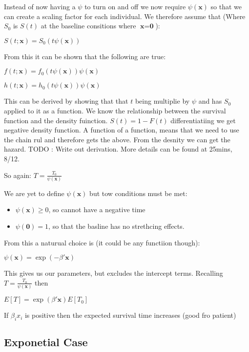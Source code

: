 \documentclass[
  letterpaper,
  DIV=11,
  numbers=noendperiod]{scrreprt}
\providecommand{\tightlist}{%
  \setlength{\itemsep}{0pt}\setlength{\parskip}{0pt}}\usepackage{longtable,booktabs,array}
\begin{document}
Instead of now having a \(\psi\) to turn on and off we now require
\(\psi(\textbf{x})\) so that we can create a scaling factor for each
individual. We therefore assume that (Where \(S_0\) is \(S(t)\) at the
baseline consitions where \(\textbf{x} = \textbf{0}\)):

\(S(t;\textbf{x}) = S_0(t\psi(\textbf{x}))\)

From this it can be shown that the following are true:

\(f(t;\textbf{x}) = f_0(t\psi(\textbf{x}))\psi(\textbf{x})\)

\(h(t;\textbf{x}) = h_0(t\psi(\textbf{x}))\psi(\textbf{x})\)

This can be derived by showing that that \(t\) being multiplie by
\(\psi\) and has \(S_0\) applied to it as a function. We know the
relationship between the survival function and the density fuinction.
\(S(t) = 1- F(t)\) differentiatiing we get negative density function. A
function of a function, means that we need to use the chain rul and
therefore gets the above. From the desnity we can get the hazard. TODO :
Write out derivation. More details can be found at 25mins, 8/12.

So again: \(T = \frac{T_0}{\psi(\textbf{x})}\)

We are yet to define \(\psi(\textbf{x})\) but tow conditions must be
met:

\begin{itemize}
\tightlist
\item
  \(\psi(\textbf{x})\geq 0\), so cannot have a negative time
\item
  \(\psi(\textbf{0}) = 1\), so that the basline has no strethcing
  effects.
\end{itemize}

From this a naturual choice is (it could be any functiion though):

\({\psi(\textbf{x})} = \exp(-\beta'\textbf{x})\)

This gives us our parameters, but excludes the intercept terms.
Recalling \(T = \frac{T_0}{\psi(\textbf{x})}\) then

\(E[T] = \exp(\beta'\textbf{x})E[T_0]\)

If \(\beta_i x_i\) is positive then the expected survival time increases
(good fro patient)

\hypertarget{exponetial-case}{%
\subsection{Exponetial Case}\label{exponetial-case}}
\end{document}
